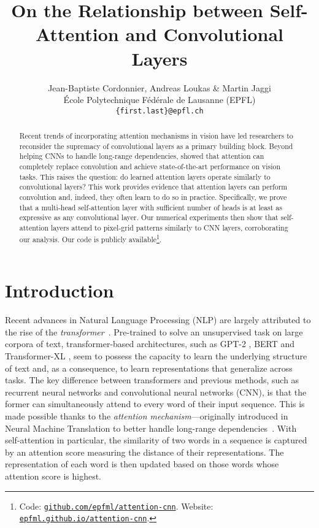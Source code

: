 \documentclass{article} \usepackage{iclr2020_conference,times}
\title{On the Relationship between Self-Attention and Convolutional Layers}
\author{Jean-Baptiste Cordonnier, Andreas Loukas \& Martin Jaggi\\
{\'E}cole Polytechnique F\'ed\'erale de Lausanne (EPFL)\\
\texttt{\{first.last\}@epfl.ch}
}
\newcommand{\githuburl}{\href{https://github.com/epfml/attention-cnn}{\tt github.com/epfml/attention-cnn}}
\newcommand{\interactiveurl}{\href{https://epfml.github.io/attention-cnn}{\tt epfml.github.io/attention-cnn}}
\begin{document}
\maketitle

\begin{abstract}
Recent trends of incorporating attention mechanisms in vision have led researchers to reconsider the supremacy of convolutional layers as a primary building block.
Beyond helping CNNs to handle long-range dependencies,
\cite{ramachandran2019standaloneselfattention} showed that attention can completely replace convolution and achieve state-of-the-art performance on vision tasks. This raises the question: do learned attention layers operate similarly to convolutional layers?
This work provides evidence that attention layers can perform convolution and, indeed, they often learn to do so in practice.
Specifically, we prove that a multi-head self-attention layer with sufficient number of heads is at least as expressive as any convolutional layer. Our numerical experiments then show that self-attention layers attend to pixel-grid patterns similarly to CNN layers, corroborating our analysis. Our code is publicly available\footnote{Code: \githuburl{}. Website: \interactiveurl{}.}.
\end{abstract}

\section{Introduction}
\vspace{-.3mm}

Recent advances in Natural Language Processing (NLP) are largely attributed to the rise of the \textit{transformer}~\citep{vaswani17attentionisallyouneed}.
Pre-trained to solve an unsupervised task on large corpora of text, transformer-based architectures, such as GPT-2 \citep{radford2018gpt2}, BERT \citep{devlin2018bert} and Transformer-XL \citep{dai2019transformerxl}, seem to possess the capacity to learn the underlying structure of text and, as a consequence, to learn representations that generalize across tasks.
The key difference between transformers and previous methods, such as recurrent neural networks \citep{lstm97} and convolutional neural networks (CNN), is that the former can simultaneously attend to every word of their input sequence.
This is made possible thanks to the \textit{attention mechanism}---originally introduced in Neural Machine Translation to better handle long-range dependencies~\citep{Bahdanau2015attention}.
With self-attention in particular, the similarity of two words in a sequence is captured by an attention score measuring the distance of their representations. The representation of each word is then updated based on those words whose attention score is highest.
\end{document}
